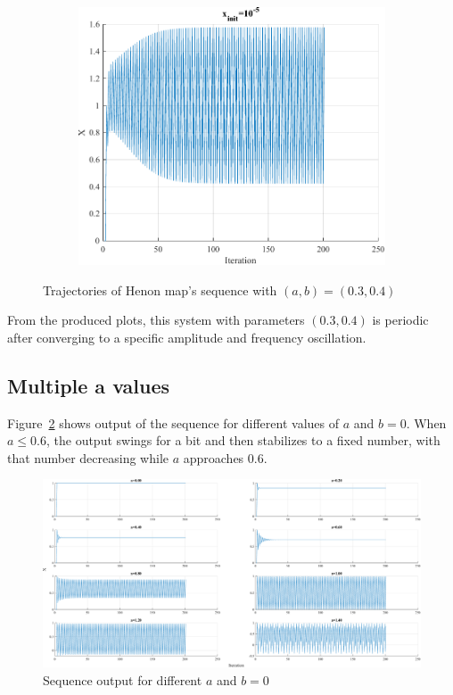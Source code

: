 \begin{figure}[htpb]
\begin{subfigure}{.47\textwidth}
		\includegraphics[width=\textwidth]{../Problem 3/prob3_x_init_1e-5.pdf}
		\caption{}
	\end{subfigure}
	\caption{Trajectories of Henon map's sequence with $(a,b) = (0.3, 0.4)$}
	\label{fig:prob3_x_init}
\end{figure}
From the produced plots, this system with parameters $(0.3, 0.4)$ is periodic after converging to a specific amplitude and frequency oscillation.

\subsection{Multiple a values}
Figure~\ref{fig:prob3_multiple_a} shows output of the sequence for different values of $a$ and $b=0$. When $a \le 0.6$, the output swings for a bit and then stabilizes to a fixed number, with that number decreasing while $a$ approaches $0.6$.


\begin{figure}[h]
	\centering
	\includegraphics[width=\textwidth]{../Problem 3/prob3_(a)_multiple_a_b_0.pdf}
	\caption{Sequence output for different $a$ and $b=0$}
	\label{fig:prob3_multiple_a}
\end{figure}

